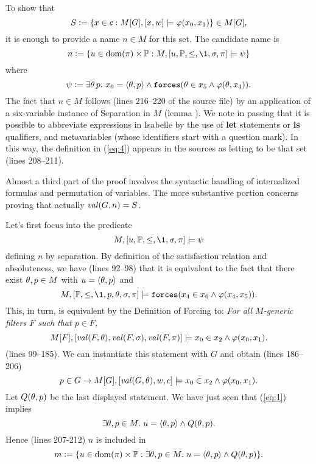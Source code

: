 To show that   
\[
S\mathrel{\mathop:}=\{x\in c : M[G],[x,w]\models \varphi(x_0,x_1)\} \in M[G],
\]
it is enough to provide a name $n\in M$ for this set. The candidate name is
\begin{equation}\label{eq:4}
n \defi \{u \in\dom(\pi)\times\PP :M,[u,\PP,\leq,\1,\sig,\pi]\models \psi\}
\end{equation}
where
\[
\psi \mathrel{\mathop:}= \exists \theta\, p.\ x_0=\langle\theta,p\rangle \wedge 
   \mathop{\mathtt{forces}}(\theta\in x_5\wedge\varphi(\theta,x_4)).
\]
The fact that $n\in M$ follows (lines 216--220 of the source file) by
an application of a six-variable instance of Separation in $M$ (lemma
). We note in
passing that it is possible to  abbreviate expressions in Isabelle by
the use of \textbf{let} statements or  \textbf{is} qualifiers,
and metavariables (whose
identifiers start with a question mark). In this way, the definition in
(\ref{eq:4}) appears in the sources as letting  to be that
set (lines 208--211).

Almost a third part of the proof involves the syntactic handling of
internalized formulas and permutation of variables. The more
substantive portion concerns proving that actually $\operatorname{\mathit{val}}(G,n)=S$.

Let's first focus into the predicate 
\begin{equation}\label{eq:1}
M,[u,\PP,\leq,\1,\sig,\pi]\models \psi
\end{equation}
defining $n$ by separation. By definition of the satisfaction
relation and %
absoluteness, we have (lines 92--98) that it is equivalent to the fact
that there exist $\theta,p\in M$ with   $u=\langle\theta,p\rangle$  and 
\[
M,[\PP,\leq,\1,p,\th,\sig,\pi]\models \forceisa(x_4\in
x_6\y\phi(x_4,x_5)). 
\]
This, in turn, is equivalent by the Definition of Forcing to: \emph{For all $M$-generic
filters $F$ such that $p\in F$,} 
\begin{equation}\label{eq:2}
M[F],[\operatorname{\mathit{val}}(F,\theta),\operatorname{\mathit{val}}(F,\sigma),\operatorname{\mathit{val}}(F,\pi)]\models x_0\in
x_2\wedge\varphi(x_0,x_1). 
\end{equation}
(lines 99--185). We can instantiate this statement with $G$ and obtain
(lines 186--206)
\[
p\in G \rightarrow M[G],[\operatorname{\mathit{val}}(G,\theta),w,c]\models x_0\in
x_2\wedge\varphi(x_0,x_1). 
\] 
Let $Q(\theta,p)$ be the last displayed statement. We have just seen that
(\ref{eq:1}) implies 
\[
\exists \theta,p\in M.\ u=\langle\theta,p\rangle \wedge Q(\theta,p).
\]
Hence (lines 207-212) $n$ is included in 
\[
m\mathrel{\mathop:}= \{u \in\operatorname{dom}(\pi)\times\mathbb{P} : \exists \theta,p\in M.\ u=\langle\theta,p\rangle
\wedge Q(\theta,p)\}. 
\]


